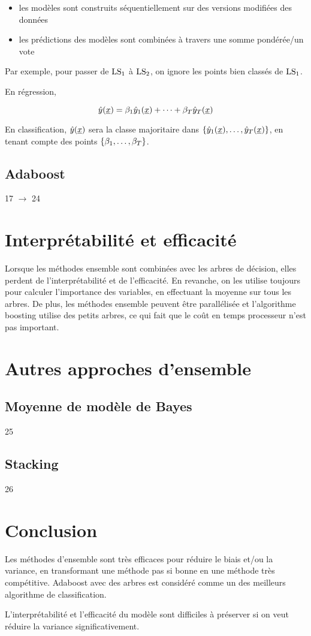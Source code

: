 \begin{itemize}
	\item les modèles sont construits séquentiellement sur des versions modifiées des données
	\item les prédictions des modèles sont combinées à travers une somme pondérée/un vote
\end{itemize}


Par exemple, pour passer de $\text{LS}_1$ à $\text{LS}_2$, on ignore les points bien classés de $\text{LS}_1$.

En régression,

$$\hat{y}(\underline{x}) = \beta_1\hat{y}_1(\underline{x}) + \dots + \beta_T \hat{y}_T(\underline{x})$$

En classification, $\hat{y}(\underline{x})$ sera la classe majoritaire dans $\lbrace \hat{y}_1(\underline{x}), \dots , \hat{y}_T(\underline{x}) \rbrace$, en tenant compte des points $\lbrace \beta_1, \dots , \beta_T \rbrace$.

	\subsection{Adaboost}
	
17 $\rightarrow$ 24
	
\section{Interprétabilité et efficacité}
	
Lorsque les méthodes ensemble sont combinées avec les arbres de décision, elles perdent de l'interprétabilité et de l'efficacité. En revanche, on les utilise toujours pour calculer l'importance des variables, en effectuant la moyenne sur tous les arbres. De plus, les méthodes ensemble peuvent être parallélisée et l'algorithme boosting utilise des petits arbres, ce qui fait que le coût en temps processeur n'est pas important.
	
		
	
	
\section{Autres approches d'ensemble}
	\subsection{Moyenne de modèle de Bayes}
	25
	\subsection{Stacking}
	26
	
\section{Conclusion}

Les méthodes d'ensemble sont très efficaces pour réduire le biais et/ou la variance, en transformant une méthode pas si bonne en une méthode très compétitive. Adaboost avec des arbres est considéré comme un des meilleurs algorithme de classification.

L'interprétabilité et l'efficacité du modèle sont difficiles à préserver si on veut réduire la variance significativement.